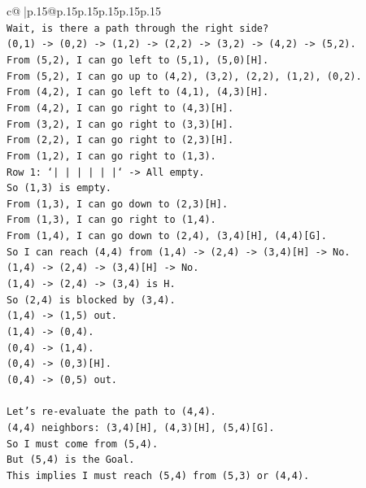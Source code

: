 \documentclass{article}
\begin{document}
{\begin{supertabular}{c@{$\;$}|p{.15\linewidth}@{}p{.15\linewidth}p{.15\linewidth}p{.15\linewidth}p{.15\linewidth}p{.15\linewidth}}
{{{\\ 
\texttt{Wait, is there a path through the right side?} \\
\texttt{(0,1) {-}> (0,2) {-}> (1,2) {-}> (2,2) {-}> (3,2) {-}> (4,2) {-}> (5,2).} \\
\texttt{From (5,2), I can go left to (5,1), (5,0){[}H{]}.} \\
\texttt{From (5,2), I can go up to (4,2), (3,2), (2,2), (1,2), (0,2).} \\
\texttt{From (4,2), I can go left to (4,1), (4,3){[}H{]}.} \\
\texttt{From (4,2), I can go right to (4,3){[}H{]}.} \\
\texttt{From (3,2), I can go right to (3,3){[}H{]}.} \\
\texttt{From (2,2), I can go right to (2,3){[}H{]}.} \\
\texttt{From (1,2), I can go right to (1,3).} \\
\texttt{Row 1: `|     |     |     |     |     |` {-}> All empty.} \\
\texttt{So (1,3) is empty.} \\
\texttt{From (1,3), I can go down to (2,3){[}H{]}.} \\
\texttt{From (1,3), I can go right to (1,4).} \\
\texttt{From (1,4), I can go down to (2,4), (3,4){[}H{]}, (4,4){[}G{]}.} \\
\texttt{So I can reach (4,4) from (1,4) {-}> (2,4) {-}> (3,4){[}H{]} {-}> No.} \\
\texttt{(1,4) {-}> (2,4) {-}> (3,4){[}H{]} {-}> No.} \\
\texttt{(1,4) {-}> (2,4) {-}> (3,4) is H.} \\
\texttt{So (2,4) is blocked by (3,4).} \\
\texttt{(1,4) {-}> (1,5) out.} \\
\texttt{(1,4) {-}> (0,4).} \\
\texttt{(0,4) {-}> (1,4).} \\
\texttt{(0,4) {-}> (0,3){[}H{]}.} \\
\texttt{(0,4) {-}> (0,5) out.} \\
\\ 
\texttt{Let's re{-}evaluate the path to (4,4).} \\
\texttt{(4,4) neighbors: (3,4){[}H{]}, (4,3){[}H{]}, (5,4){[}G{]}.} \\
\texttt{So I must come from (5,4).} \\
\texttt{But (5,4) is the Goal.} \\
\texttt{This implies I must reach (5,4) from (5,3) or (4,4).} \\
}}}
\end{supertabular}}
\end{document}
